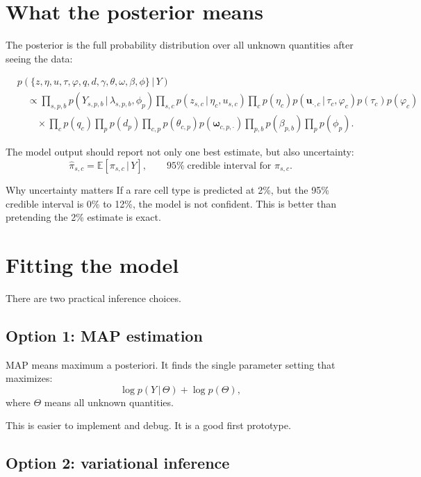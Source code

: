\documentclass[11pt]{article}
\newcommand{\E}{\mathbb{E}}
\newcommand{\given}{\,|\,}
\begin{document}
\section{What the posterior means}

The posterior is the full probability distribution over all unknown quantities after seeing the data:

\begin{align}
&p(\{z,\eta,u,\tau,\varphi,q,d,\gamma,\theta,\omega,\beta,\phi\}\given Y) \\
&\quad \propto
\prod_{s,p,b} p(Y_{s,p,b}\given \lambda_{s,p,b},\phi_p)
\prod_{s,c} p(z_{s,c}\given \eta_c,u_{s,c})
\prod_c p(\eta_c)p(\boldsymbol{u}_{\cdot,c}\given \tau_c,\varphi_c)p(\tau_c)p(\varphi_c) \\
&\qquad \times
\prod_c p(q_c)
\prod_p p(d_p)
\prod_{c,p} p(\theta_{c,p})p(\boldsymbol{\omega}_{c,p,\cdot})
\prod_{p,b} p(\beta_{p,b})
\prod_p p(\phi_p).
\end{align}

The model output should report not only one best estimate, but also uncertainty:
\[
\widehat{\pi}_{s,c}=\E[\pi_{s,c}\given Y],
\qquad
95\%\;\text{credible interval for }\pi_{s,c}.
\]

\begin{plainbox}{Why uncertainty matters}
If a rare cell type is predicted at 2\%, but the 95\% credible interval is 0\% to 12\%, the model is not confident.  This is better than pretending the 2\% estimate is exact.
\end{plainbox}

\section{Fitting the model}

There are two practical inference choices.

\subsection{Option 1: MAP estimation}

MAP means maximum a posteriori.  It finds the single parameter setting that maximizes:
\[
\log p(Y\given \Theta)+\log p(\Theta),
\]
where \(\Theta\) means all unknown quantities.

This is easier to implement and debug.  It is a good first prototype.

\subsection{Option 2: variational inference}
\end{document}
